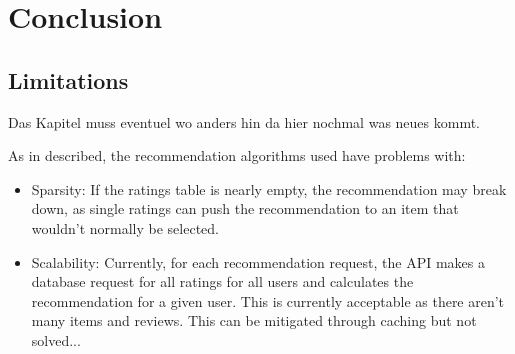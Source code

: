 \chapter{Conclusion}

\section{Limitations}

Das Kapitel muss eventuel wo anders hin da hier nochmal was neues kommt.

As in \cite{itemColFiltRecom} described, the recommendation algorithms used have problems with:

\begin{itemize}
    \item Sparsity: If the ratings table is nearly empty, the recommendation may break down, as single ratings can push the recommendation to an item that wouldn't normally be selected.
    \item Scalability: Currently, for each recommendation request, the API makes a database request for all ratings for all users and calculates the recommendation for a given user. This is currently acceptable as there aren't many items and reviews. This can be mitigated through caching but not solved... 
\end{itemize}